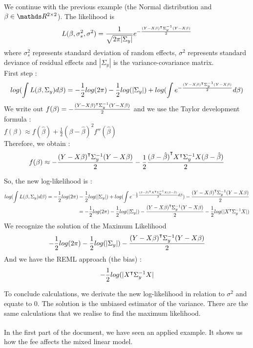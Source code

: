 \documentclass{article}
\begin{document}
\begin{example} 
We continue with the previous example (the Normal distribution and $\beta \in \bbR^{2\times 2}$). The likelihood is
\[L(\beta, \sigma_s^2, \sigma^2) = \frac{1}{\sqrt{2\pi |\Sigma_y|}}e^{-\frac{{(Y-X\beta)}^\intercal\Sigma_y^{-1}(Y-X\beta)}{2}}\]
where $\sigma_s^2$ represents standard deviation of random effects, $\sigma^2$  represents standard deviance of residual effects and $|\Sigma_y|$ is the variance-covariance matrix.\\
First step :
\[log(\int L(\beta, \Sigma_y)d\beta) = -\frac{1}{2}log(2\pi)-\frac{1}{2}log(|\Sigma_y|)+log(\int e^{-\frac{{(Y-X\beta)}^\intercal\Sigma_y^{-1}(Y-X\beta)}{2}} d\beta)\]
We write out $f(\beta) = -\frac{{(Y-X\beta)}^\intercal\Sigma_y^{-1}(Y-X\beta)}{2}$ and we use the Taylor development formula : \\
$f(\beta) \approx f(\hat{\beta}) + \frac{1}{2}(\beta - \hat{\beta})^2f''(\hat{\beta})$\\
Therefore, we obtain :
\[f(\beta) \approx -\frac{{(Y-X\beta)}^\intercal\Sigma_y^{-1}(Y-X\beta)}{2}-\frac{1}{2}\frac{{(\beta-\hat{\beta})}^\intercal {X}^\intercal \Sigma_y^{-1}X (\beta-\hat{\beta})}{2}\]

So, the new log-likelihood is :
\begin{equation*}
    \begin{split}
       log(\int L(\beta, \Sigma_y)d\beta) = -\frac{1}{2}log(2\pi)-\frac{1}{2}log(|\Sigma_y|)+log(\int e^{-\frac{1}{2}\frac{{(\beta-\hat{\beta})}^\intercal {X}^\intercal \Sigma_y^{-1}X (\beta-\hat{\beta})}{2} d\beta}) -\frac{{(Y-X\beta)}^\intercal\Sigma_y^{-1}(Y-X\beta)}{2}\\
       =-\frac{1}{2}log(2\pi)-\frac{1}{2}log(|\Sigma_y|)-\frac{{(Y-X\beta)}^\intercal\Sigma_y^{-1}(Y-X\beta)}{2} - \frac{1}{2}log(|{X}^\intercal\Sigma_y^{-1}X|)  
    \end{split}
\end{equation*}
We recognize the solution of the Maximum Likelihood
\[-\frac{1}{2}log(2\pi)-\frac{1}{2}log(|\Sigma_y|)-\frac{{(Y-X\beta)}^\intercal\Sigma_y^{-1}(Y-X\beta)}{2}\]
And we have the REML approach (the bias) : \[- \frac{1}{2}log(|{X}^\intercal \Sigma_y^{-1}X|\]
\end{example}
To conclude calculations, we derivate the new log-likelihood in relation to $\sigma^2$ and equate to $0$. The solution is the unbiased estimator of the variance. There are the same calculations that we realise to find the maximum likelihood.\\
\\
In the first part of the document, we have seen an applied example. It shows us how the fee affects the mixed linear model.
\end{document}
